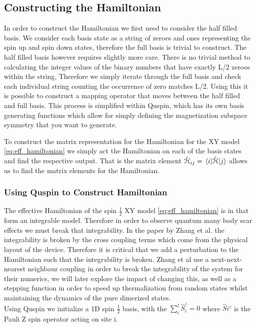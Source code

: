 \subsection{Constructing the Hamiltonian}
In order to construct the Hamiltonian we first need to consider the half filled basis. We consider each basis state as a string of zeroes and ones representing the spin up and spin down states, therefore the full basis is trivial to construct. The half filled basis however requires slightly more care. There is no trivial method to calculating the integer values of the binary numbers that have exactly L/2 zeroes within the string, Therefore we simply iterate through the full basis and check each individual string counting the occurrence of zero matches L/2. Using this it is possible to construct a mapping operator that moves between the half filled and full basis. This process is simplified within Quspin, which has its own basis generating functions which allow for simply defining the magnetization subspace symmetry that you want to generate. 

To construct the matrix representation for the Hamiltonian for the XY model \ref{eq:eff_hamiltonian} we simply act the Hamiltonian on each of the basis states and find the respective output. That is the matrix element $\hat{\mathcal{H}}_{ij} = \mel*{i}{\hat{\mathcal{H}}}{j}$ allows us to find the matrix elements for the Hamiltonian. 

\subsubsection{Using Quspin to Construct Hamiltonian}

The effective Hamiltonian of the spin $\frac 1 2 $ XY model \ref{eq:eff_hamiltonian} is in that form an integrable model. Therefore in order to observe quantum many body scar effects we must break that integrability. In the paper by Zhang et al.\citep{zhang_many-body_2022} the integrability is broken by the cross coupling terms which come from the physical layout of the device. Therefore it is critical that we add a perturbation to the Hamiltonian such that the integrability is broken. 
Zhang et al\citep{zhang_many-body_2022} use a next-next-nearest neighbour coupling in order to break the integrability of the system for their numerics, we will later explore the impact of changing this, as well as a stepping function in order to speed up thermalization from random states whilst maintaining the dynamics of the pure dimerized states. \\
Using Quspin we initialize a 1D spin $\frac 1 2$ basis, with the $\sum_i^l\hat{S}^z_i = 0 $ where $\hat{S }i^z$ is the Pauli Z spin operator acting on site i. 

